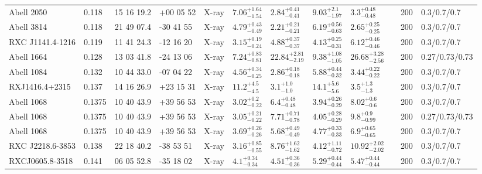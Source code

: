 \begin{landscape}
\begin{center}
{\begin{longtable}{llllllllllll}
Abell 2050 & 0.118 & 15 16 19.2 & +00 05 52 & X-ray & ${7.06}^{+1.64}_{-1.54}$ & ${2.84}^{+0.41}_{-0.41}$ & ${9.03}^{+2.1}_{-1.97}$ & ${3.3}^{+0.48}_{-0.48}$ & \citet{ET11.1} & 200 & 0.3/0.7/0.7 \\
Abell 3814 & 0.118 & 21 49 07.4 & -30 41 55 & X-ray & ${4.79}^{+0.43}_{-0.49}$ & ${2.21}^{+0.21}_{-0.21}$ & ${6.19}^{+0.56}_{-0.63}$ & ${2.65}^{+0.25}_{-0.25}$ & \citet{ET11.1} & 200 & 0.3/0.7/0.7 \\
RXC J1141.4-1216 & 0.119 & 11 41 24.3 & -12 16 20 & X-ray & ${3.15}^{+0.19}_{-0.24}$ & ${4.88}^{+0.37}_{-0.37}$ & ${4.13}^{+0.25}_{-0.31}$ & ${6.12}^{+0.46}_{-0.46}$ & \citet{ET11.1} & 200 & 0.3/0.7/0.7 \\
Abell 1664 & 0.128 & 13 03 41.8 & -24 13 06 & X-ray & ${7.24}^{+0.83}_{-0.81}$ & ${22.84}^{+2.81}_{-2.19}$ & ${9.38}^{+1.08}_{-1.05}$ & ${26.68}^{+3.28}_{-2.56}$ & \citet{BA14.1} & 200 & 0.27/0.73/0.73 \\
Abell 1084 & 0.132 & 10 44 33.0 & -07 04 22 & X-ray & ${4.56}^{+0.34}_{-0.25}$ & ${2.86}^{+0.18}_{-0.18}$ & ${5.88}^{+0.44}_{-0.32}$ & ${3.44}^{+0.22}_{-0.22}$ & \citet{ET11.1} & 200 & 0.3/0.7/0.7 \\
RXJ1416.4+2315 & 0.137 & 14 16 26.9 & +23 15 31 & X-ray & ${11.2}^{+4.5}_{-4.5}$ & ${3.1}^{+1.0}_{-1.0}$ & ${14.1}^{+5.6}_{-5.6}$ & ${3.5}^{+1.3}_{-1.3}$ & \citet{KH06.1} & 200 & 0.3/0.7/0.7 \\
Abell 1068 & 0.1375 & 10 40 43.9 & +39 56 53 & X-ray & ${3.02}^{+0.2}_{-0.22}$ & ${6.4}^{+0.48}_{-0.48}$ & ${3.94}^{+0.26}_{-0.29}$ & ${8.02}^{+0.6}_{-0.6}$ & \citet{ET11.1} & 200 & 0.3/0.7/0.7 \\
Abell 1068 & 0.1375 & 10 40 43.9 & +39 56 53 & X-ray & ${3.05}^{+0.21}_{-0.22}$ & ${7.71}^{+0.71}_{-0.78}$ & ${4.05}^{+0.28}_{-0.29}$ & ${9.8}^{+0.9}_{-0.99}$ & \citet{BA14.1} & 200 & 0.27/0.73/0.73 \\
Abell 1068 & 0.1375 & 10 40 43.9 & +39 56 53 & X-ray & ${3.69}^{+0.26}_{-0.26}$ & ${5.68}^{+0.49}_{-0.49}$ & ${4.77}^{+0.33}_{-0.33}$ & ${6.9}^{+0.65}_{-0.65}$ & \citet{PO05.1} & 200 & 0.3/0.7/0.7 \\
RXC J2218.6-3853 & 0.138 & 22 18 40.2 & -38 53 51 & X-ray & ${3.16}^{+0.85}_{-0.55}$ & ${8.76}^{+1.62}_{-1.62}$ & ${4.12}^{+1.11}_{-0.72}$ & ${10.92}^{+2.02}_{-2.02}$ & \citet{ET11.1} & 200 & 0.3/0.7/0.7 \\
RXCJ0605.8-3518 & 0.141 & 06 05 52.8 & -35 18 02 & X-ray & ${4.1}^{+0.34}_{-0.34}$ & ${4.51}^{+0.36}_{-0.36}$ & ${5.29}^{+0.44}_{-0.44}$ & ${5.47}^{+0.44}_{-0.44}$ & \citet{ET11.1} & 200 & 0.3/0.7/0.7 \\

\end{longtable}}
\end{center}
\end{landscape}

